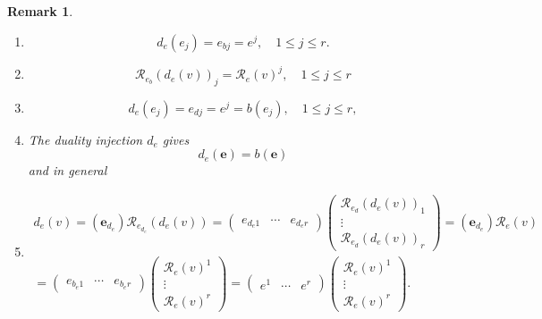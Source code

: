 \documentclass[aps,preprint]{revtex4}
\newtheorem{remark}[theorem]{Remark}
\begin{document}
\begin{remark}
\begin{enumerate}
\item 
\begin{equation}
d_{e}\left( e_{j}\right) =e_{bj}=e^{j},\quad 1\leq j\leq r.
\end{equation}

\item 
\begin{equation}
\mathcal{R}_{e_{b}}\left( d_{e}\left( v\right) \right) _{j}=\mathcal{R}%
_{e}\left( v\right) ^{j},\quad 1\leq j\leq r
\end{equation}

\item 
\begin{equation}
d_{e}\left( e_{j}\right) =e_{dj}=e^{j}=b\left( e_{j}\right) ,\quad 1\leq
j\leq r,
\end{equation}

\item The duality injection $d_{e}$ gives%
\begin{equation}
d_{e}\left( \boldsymbol{e}\right) =b\left( \boldsymbol{e}\right)
\end{equation}%
and in general

\item 
\begin{gather}
d_{e}\left( v\right) =\left( \boldsymbol{e}_{d_{e}}\right) \mathcal{R}%
_{e_{d_{e}}}\left( d_{e}\left( v\right) \right) =\left( 
\begin{array}{ccc}
e_{d_{e}1} & \cdots & e_{d_{e}r}%
\end{array}%
\right) \left( 
\begin{array}{c}
\mathcal{R}_{e_{d}}\left( d_{e}\left( v\right) \right) _{1} \\ 
\vdots \\ 
\mathcal{R}_{e_{d}}\left( d_{e}\left( v\right) \right) _{r}%
\end{array}%
\right) =\left( \boldsymbol{e}_{d_{e}}\right) \mathcal{R}_{e}\left( v\right)
\\
=\left( 
\begin{array}{ccc}
e_{b_{e}1} & \cdots & e_{b_{e}r}%
\end{array}%
\right) \left( 
\begin{array}{c}
\mathcal{R}_{e}\left( v\right) ^{1} \\ 
\vdots \\ 
\mathcal{R}_{e}\left( v\right) ^{r}%
\end{array}%
\right) =\left( 
\begin{array}{ccc}
e^{1} & \cdots & e^{r}%
\end{array}%
\right) \left( 
\begin{array}{c}
\mathcal{R}_{e}\left( v\right) ^{1} \\ 
\vdots \\ 
\mathcal{R}_{e}\left( v\right) ^{r}%
\end{array}%
\right) .
\end{gather}
\end{enumerate}
\end{remark}
\end{document}
